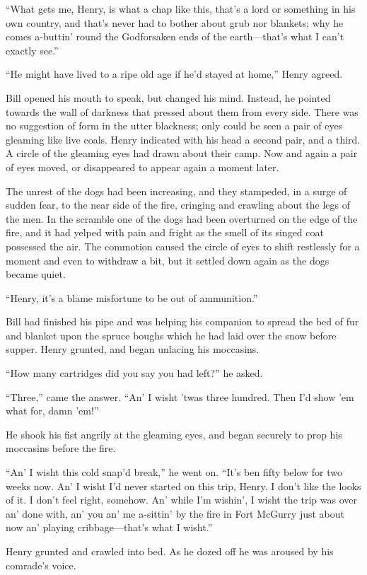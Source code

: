 “What gets me, Henry, is what a chap like this, that’s a lord or
something in his own country, and that’s never had to bother about grub
nor blankets; why he comes a-buttin’ round the Godforsaken ends of the
earth—that’s what I can’t exactly see.”

“He might have lived to a ripe old age if he’d stayed at home,” Henry
agreed.

Bill opened his mouth to speak, but changed his mind. Instead, he
pointed towards the wall of darkness that pressed about them from every
side. There was no suggestion of form in the utter blackness; only
could be seen a pair of eyes gleaming like live coals. Henry indicated
with his head a second pair, and a third. A circle of the gleaming eyes
had drawn about their camp. Now and again a pair of eyes moved, or
disappeared to appear again a moment later.

The unrest of the dogs had been increasing, and they stampeded, in a
surge of sudden fear, to the near side of the fire, cringing and
crawling about the legs of the men. In the scramble one of the dogs had
been overturned on the edge of the fire, and it had yelped with pain
and fright as the smell of its singed coat possessed the air. The
commotion caused the circle of eyes to shift restlessly for a moment
and even to withdraw a bit, but it settled down again as the dogs
became quiet.

“Henry, it’s a blame misfortune to be out of ammunition.”

Bill had finished his pipe and was helping his companion to spread the
bed of fur and blanket upon the spruce boughs which he had laid over
the snow before supper. Henry grunted, and began unlacing his
moccasins.

“How many cartridges did you say you had left?” he asked.

“Three,” came the answer. “An’ I wisht ’twas three hundred. Then I’d
show ’em what for, damn ’em!”

He shook his fist angrily at the gleaming eyes, and began securely to
prop his moccasins before the fire.

“An’ I wisht this cold snap’d break,” he went on. “It’s ben fifty below
for two weeks now. An’ I wisht I’d never started on this trip, Henry. I
don’t like the looks of it. I don’t feel right, somehow. An’ while I’m
wishin’, I wisht the trip was over an’ done with, an’ you an’ me
a-sittin’ by the fire in Fort McGurry just about now an’ playing
cribbage—that’s what I wisht.”

Henry grunted and crawled into bed. As he dozed off he was aroused by
his comrade’s voice.

